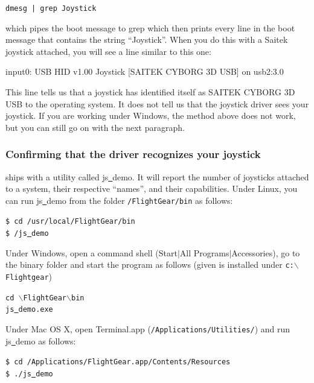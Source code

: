 	\texttt{dmesg | grep Joystick}
\medskip

\noindent
which pipes the boot message to grep which then prints every line in the
boot message that contains the string ``Joystick''.  When you do this with a
Saitek joystick attached, you will see a line similar to this one:
\medskip

\begin{ttfamily}
\noindent
   input0: USB HID v1.00 Joystick [SAITEK CYBORG 3D USB] on usb2:3.0
\end{ttfamily}
\medskip

\noindent
This line tells us that a joystick has identified itself as SAITEK CYBORG 3D USB to the operating system.  It does not tell us that the joystick driver sees your joystick. If you are working under Windows, the method above does not work, but you can still go on with the next paragraph.

\subsubsection{Confirming that the driver recognizes your joystick\label{confirming}}
\FlightGear{} ships with a utility called js\underline{~}demo. It will report the number of joysticks attached to a system, their respective ``names'', and their capabilities. Under Linux, you can run js\underline{~}demo from the folder \texttt{/FlightGear/bin} as follows:
\medskip

\noindent
	\texttt{\$ cd /usr/local/FlightGear/bin}\\
	\texttt{\$ \./js\underline{~}demo}
\medskip

\noindent
Under Windows, open a command shell (Start$\left|\right.$All Programs$\left|\right.$Accessories), go to the \FlightGear{} binary folder and start the program as follows (given \FlightGear{} is installed under \texttt{c:$\backslash$Flightgear})
\medskip

\noindent
	\texttt{cd {$\backslash$}FlightGear{$\backslash$}bin}\\
	\texttt{js\underline{~}demo.exe}
\medskip

\noindent
Under Mac OS X, open Terminal.app (\texttt{/Applications/Utilities/}) and run js\underline{~}demo as follows:
\medskip

\noindent
	\texttt{\$ cd /Applications/FlightGear.app/Contents/Resources}\\
	\texttt{\$ ./js\underline{~}demo}
\medskip

